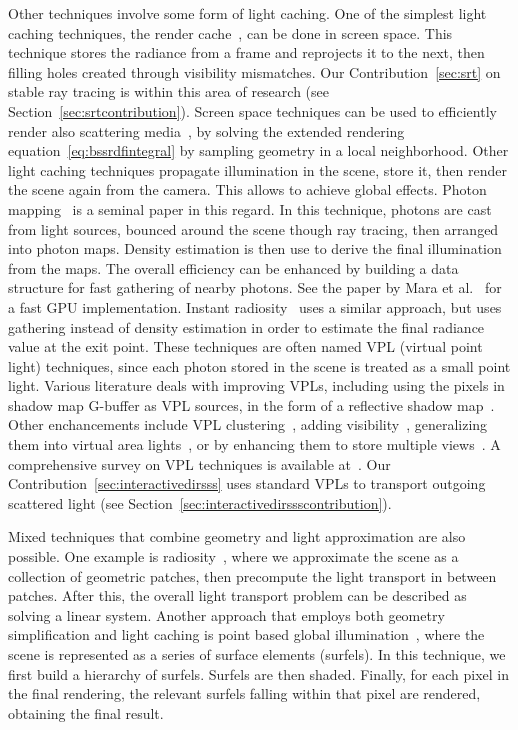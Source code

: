 Other techniques involve some form of light caching. One of the simplest light caching techniques, the render cache~\cite{Walter2002}, can be done in screen space. This technique stores the radiance from a frame and reprojects it to the next, then filling holes created through visibility mismatches. Our Contribution~\ref{sec:srt} on stable ray tracing is within this area of research (see Section~\ref{sec:srtcontribution}). Screen space techniques can be used to efficiently render also scattering media~\cite{Nalbach2014}, by solving the extended rendering equation~\ref{eq:bssrdfintegral} by sampling geometry in a local neighborhood. Other light caching techniques propagate illumination in the scene, store it, then render the scene again from the camera. This allows to achieve global effects. Photon mapping~\cite{Jensen1996} is a seminal paper in this regard. In this technique, photons are cast from light sources, bounced around the scene though ray tracing, then arranged into photon maps. Density estimation is then use to derive the final illumination from the maps. The overall efficiency can be enhanced by building a data structure for fast gathering of nearby photons. See the paper by Mara et al.~\cite{Mara2013} for a fast GPU implementation. Instant radiosity~\cite{Keller1997} uses a similar approach, but uses gathering instead of density estimation in order to estimate the final radiance value at the exit point. These techniques are often named VPL (virtual point light) techniques, since each photon stored in the scene is treated as a small point light. Various literature deals with improving VPLs, including using the pixels in shadow map G-buffer as VPL sources, in the form of a reflective shadow map~\cite{Frisvad2005,Dachsbacher2005}. Other enchancements include VPL clustering~\cite{Walter2005, Bus2015}, adding visibility~\cite{Ritschel2008}, generalizing them into virtual area lights~\cite{Dong09}, or by enhancing them to store multiple views~\cite{Simon2015}. A comprehensive survey on VPL techniques is available at~\cite{Dachsbacher2014}. Our Contribution~\ref{sec:interactivedirsss} uses standard VPLs to transport outgoing scattered light (see Section~\ref{sec:interactivedirssscontribution}).

Mixed techniques that combine geometry and light approximation are also possible. One example is radiosity~\cite{Goral1984}, where we approximate the scene as a collection of geometric patches, then precompute the light transport in between patches. After this, the overall light transport problem can be described as solving a linear system. Another approach that employs both geometry simplification and light caching is point based global illumination~\cite{Bunnel2005, Christensen2008}, where the scene is represented as a series of surface elements (surfels). In this technique, we first build a hierarchy of surfels. Surfels are then shaded. Finally, for each pixel in the final rendering, the relevant surfels falling within that pixel are rendered, obtaining the final result. 

